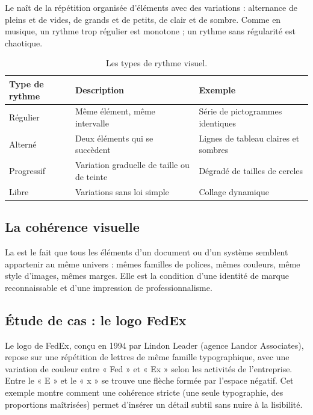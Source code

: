 Le  naît de la répétition organisée d'éléments avec des variations : alternance de pleins et de vides, de grands et de petits, de clair et de sombre. Comme en musique, un rythme trop régulier est monotone ; un rythme sans régularité est chaotique.

\begin{table}[h!]
\centering
\begin{tabular}{@{}p{3.2cm}p{5.3cm}p{5.5cm}@{}}
\toprule
\textbf{Type de rythme} & \textbf{Description} & \textbf{Exemple} \\
\midrule
Régulier & Même élément, même intervalle & Série de pictogrammes identiques \\
Alterné & Deux éléments qui se succèdent & Lignes de tableau claires et sombres \\
Progressif & Variation graduelle de taille ou de teinte & Dégradé de tailles de cercles \\
Libre & Variations sans loi simple & Collage dynamique \\
\bottomrule
\end{tabular}
\caption{Les types de rythme visuel.}
\end{table}

\subsection{La cohérence visuelle}

La  est le fait que tous les éléments d'un document ou d'un système semblent appartenir au même univers : mêmes familles de polices, mêmes couleurs, même style d'images, mêmes marges. Elle est la condition d'une identité de marque reconnaissable et d'une impression de professionnalisme.

\subsection{Étude de cas : le logo FedEx}

Le logo de FedEx, conçu en 1994 par Lindon Leader (agence Landor Associates), repose sur une répétition de lettres de même famille typographique, avec une variation de couleur entre « Fed » et « Ex » selon les activités de l'entreprise. Entre le « E » et le « x » se trouve une flèche formée par l'espace négatif. Cet exemple montre comment une cohérence stricte (une seule typographie, des proportions maîtrisées) permet d'insérer un détail subtil sans nuire à la lisibilité.

